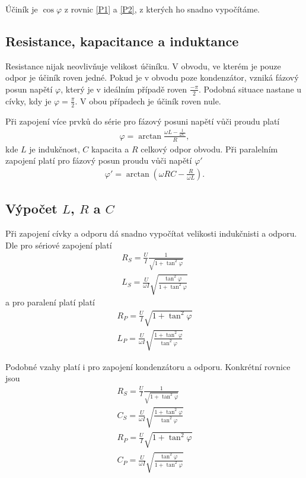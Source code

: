 \documentclass[a4paper,12pt]{article}
\begin{document}
Účiník je $\cos\varphi$ z rovnic \ref{P1} a \ref{P2}, z kterých ho snadno vypočítáme.

\subsection{Resistance, kapacitance a induktance}
Resistance nijak neovlivňuje velikost účiníku. V obvodu, ve kterém je pouze odpor je účiník roven jedné. Pokud je v obvodu poze kondenzátor, vzniká fázový posun napětí $\varphi$, který 
je v ideálním případě roven $\frac{-\pi}{2}$. Podobná situace nastane u cívky, kdy je $\varphi=\frac{\pi}{2}$. V obou případech je účiník roven nule.

Při zapojení více prvků do série pro fázový posuni napětí vůči proudu platí
\begin{eqnarray}
\varphi=\arctan\frac{\omega L-\frac{1}{\omega C}}{R},
\end{eqnarray}
kde $L$ je indukčnost, $C$ kapacita a $R$ celkový odpor obvodu. Při paralelním zapojení platí 
pro fázový posun proudu vůči napětí $\varphi'$
\begin{eqnarray}
\varphi'=\arctan\left(\omega RC-\frac{R}{\omega L}\right).
\end{eqnarray}

\subsection{Výpočet $L$, $R$ a $C$}
Při zapojení cívky a odporu dá snadno vypočítat velikosti indukčnisti a odporu. Dle \cite{text} pro sériové zapojení platí
\begin{eqnarray}
R_S=\frac{U}{I}\frac{1}{\sqrt{1+\tan^2\varphi}} \label{LRS}\\ 
L_S=\frac{U}{\omega I}\sqrt{\frac{\tan^2\varphi}{1+\tan^2\varphi}}
\label{LLS}
\end{eqnarray}
a pro paralení platí
platí
\begin{eqnarray}
R_P=\frac{U}{I}\sqrt{1+\tan^2\varphi}\\
\label{LRP}
L_P=\frac{U}{\omega I}\sqrt{\frac{1+\tan^2\varphi}{\tan^2\varphi}}
\label{LLP}
\end{eqnarray}

Podobné vzahy platí i pro zapojení kondenzátoru a odporu. Konkrétní rovnice jsou
\begin{eqnarray}
R_S=\frac{U}{I}\frac{1}{\sqrt{1+\tan^2\varphi}}
\label{CRS}\\
C_S=\frac{U}{\omega I}\sqrt{\frac{1+\tan^2\varphi}{\tan^2\varphi}}
\label{CCS}\\
R_P=\frac{U}{I}\sqrt{1+\tan^2\varphi}
\label{CRP}\\
C_P=\frac{U}{\omega I}\sqrt{\frac{\tan^2\varphi}{1+\tan^2\varphi}}
\label{CLP}
\end{eqnarray}
\end{document}
